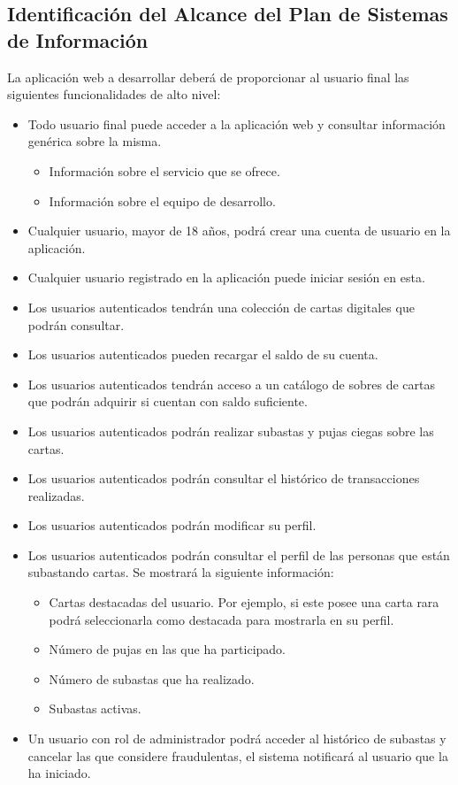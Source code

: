 \subsection{Identificación del Alcance del Plan de Sistemas de Información}  \label{sec:2_identificacion_alcance_PSI}
\hypertarget{sec:2_identificacion_alcance_PSI}{}
La aplicación web a desarrollar deberá de proporcionar al usuario final las siguientes funcionalidades de alto nivel:
\begin{itemize}
    \item Todo usuario final puede acceder a la aplicación web y consultar información genérica sobre la misma.
    \begin{itemize}
        \item Información sobre el servicio que se ofrece.
        \item Información sobre el equipo de desarrollo.
    \end{itemize}
    \item Cualquier usuario, mayor de 18 años, podrá crear una cuenta de usuario en la aplicación.
    \item Cualquier usuario registrado en la aplicación puede iniciar sesión en esta.
    \item Los usuarios autenticados tendrán una colección de cartas digitales que podrán consultar.
    \item Los usuarios autenticados pueden recargar el saldo de su cuenta.
    \item Los usuarios autenticados tendrán acceso a un catálogo de sobres de cartas que podrán adquirir si cuentan con saldo suficiente.
    \item Los usuarios autenticados podrán realizar subastas y pujas ciegas sobre las cartas.
    \item Los usuarios autenticados podrán consultar el histórico de transacciones realizadas.
    \item Los usuarios autenticados podrán modificar su perfil.
    \item Los usuarios autenticados podrán consultar el perfil de las personas que están subastando cartas. Se mostrará la siguiente información:
    \begin{itemize}
        \item Cartas destacadas del usuario. Por ejemplo, si este posee una carta rara podrá seleccionarla como destacada para mostrarla en su perfil.
        \item Número de pujas en las que ha participado.
        \item Número de subastas que ha realizado.
        \item Subastas activas.
    \end{itemize}
    \item Un usuario con rol de administrador podrá acceder al histórico de subastas y cancelar las que considere fraudulentas, el sistema notificará al usuario que la ha iniciado.
\end{itemize}

